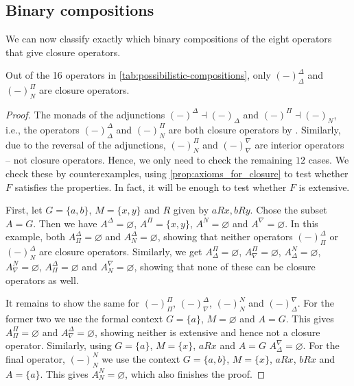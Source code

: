 \subsection{Binary compositions}

We can now classify exactly which binary compositions of the eight operators that give closure operators. 

\begin{theorem}
    Out of the 16 operators in \cref{tab:possibilistic-compositions}, only $(-)^\Delta_\Delta$ and $(-)^\Pi_N$ are closure operators. 
\end{theorem}
\begin{proof}
    The monads of the adjunctions $(-)^\Delta \dashv (-)_\Delta$ and $(-)^\Pi \dashv (-)_N$, i.e., the operators $(-)^\Delta_\Delta$ and $(-)^\Pi_N$ are both closure operators by \cite[2.1.11]{jarvis_2025}. Similarly, due to the reversal of the adjunctions, $(-)^\Pi_N$ and $(-)^\nabla_\nabla$ are interior operators -- not closure operators. Hence, we only need to check the remaining $12$ cases. We check these by counterexamples, using \cref{prop:axioms_for_closure} to test whether $F$ satisfies the properties. In fact, it will be enough to test whether $F$ is extensive. 

    First, let $G=\{a,b\}$, $M=\{x,y\}$ and $R$ given by $aRx, bRy$. Chose the subset $A=G$. Then we have $A^\Delta = \varnothing$, $A^\Pi = \{x,y\}$, $A^N=\varnothing$ and $A^\nabla = \varnothing$. In this example, both $A^\Delta_\Pi = \varnothing$ and $A^\Delta_N = \varnothing$, showing that neither operators $(-)^\Delta_\Pi$ or $(-)^\Delta_N$ are closure operators. Similarly, we get $A^\Pi_\Delta = \varnothing$, $A^\Pi_\nabla=\varnothing$, $A^N_\Delta = \varnothing$, $A^N_\nabla = \varnothing$, $A^\Delta_\Pi = \varnothing$ and $A^\nabla_N = \varnothing$, showing that none of these can be closure operators as well. 

    It remains to show the same for $(-)^\Pi_\Pi$, $(-)^\Delta_\nabla$, $(-)^N_N$ and $(-)^\nabla_\Delta$. For the former two we use the formal context $G=\{a\}$, $M=\varnothing$ and $A=G$. This gives $A^\Pi_\Pi = \varnothing$ and $A^\Delta_\nabla = \varnothing$, showing neither is extensive and hence not a closure operator. Similarly, using $G=\{a\}$, $M=\{x\}$, $aRx$ and $A=G$ $A^\nabla_\Delta = \varnothing$. For the final operator, $(-)^N_N$ we use the context $G=\{a,b\}$, $M=\{x\}$, $aRx$, $bRx$ and $A=\{a\}$. This gives $A^N_N = \varnothing$, which also finishes the proof. 
\end{proof}

